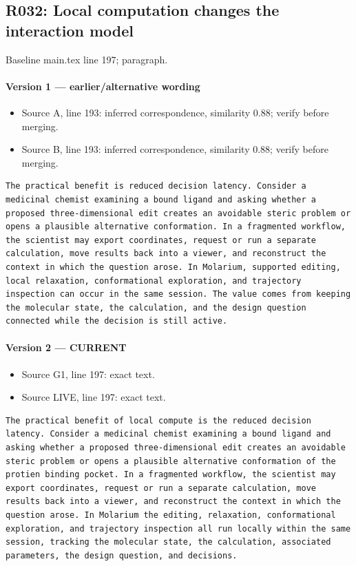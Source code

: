 \documentclass[11pt]{article}
\begin{document}
\subsection{R032: Local computation changes the interaction model}

Baseline main.tex line 197; paragraph.

\paragraph{Version 1 --- earlier/alternative wording}

\begin{itemize}[leftmargin=*]
\item Source A, line 193: inferred correspondence, similarity 0.88; verify before merging.
\item Source B, line 193: inferred correspondence, similarity 0.88; verify before merging.
\end{itemize}

\begin{lstlisting}
The practical benefit is reduced decision latency. Consider a medicinal chemist examining a bound ligand and asking whether a proposed three-dimensional edit creates an avoidable steric problem or opens a plausible alternative conformation. In a fragmented workflow, the scientist may export coordinates, request or run a separate calculation, move results back into a viewer, and reconstruct the context in which the question arose. In Molarium, supported editing, local relaxation, conformational exploration, and trajectory inspection can occur in the same session. The value comes from keeping the molecular state, the calculation, and the design question connected while the decision is still active.
\end{lstlisting}

\paragraph{Version 2 --- CURRENT}

\begin{itemize}[leftmargin=*]
\item Source G1, line 197: exact text.
\item Source LIVE, line 197: exact text.
\end{itemize}

\begin{lstlisting}
The practical benefit of local compute is the reduced decision latency. Consider a medicinal chemist examining a bound ligand and asking whether a proposed three-dimensional edit creates an avoidable steric problem or opens a plausible alternative conformation of the protien binding pocket. In a fragmented workflow, the scientist may export coordinates, request or run a separate calculation, move results back into a viewer, and reconstruct the context in which the question arose. In Molarium the editing, relaxation, conformational exploration, and trajectory inspection all run locally within the same session, tracking the molecular state, the calculation, associated parameters, the design question, and decisions.
\end{lstlisting}
\end{document}
